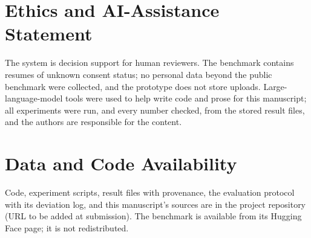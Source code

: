 \section*{Ethics and AI-Assistance Statement}
The system is decision support for human reviewers. The benchmark contains resumes of unknown consent
status; no personal data beyond the public benchmark were collected, and the prototype does not store uploads.
Large-language-model tools were used to help write code and prose for this manuscript; all experiments were run,
and every number checked, from the stored result files, and the authors are responsible for the content.

\section*{Data and Code Availability}
Code, experiment scripts, result files with provenance, the evaluation protocol with its deviation log, and
this manuscript's sources are in the project repository (URL to be added at submission). The benchmark is
available from its Hugging Face page; it is not redistributed.
